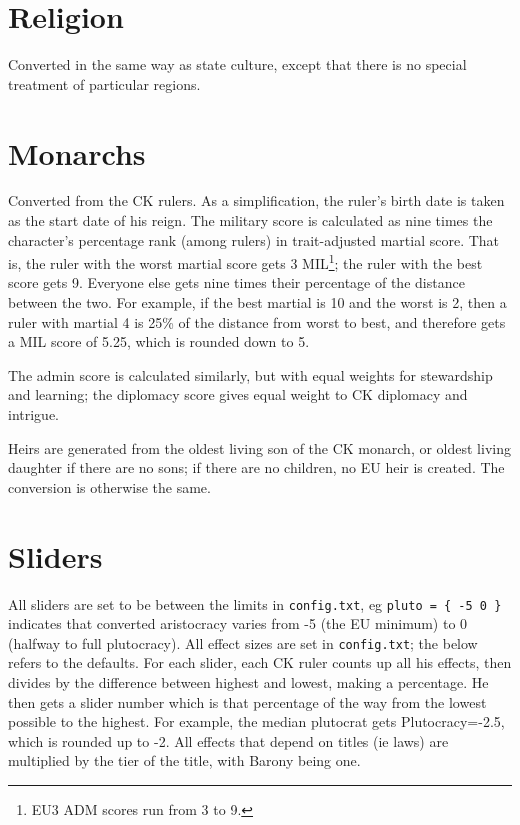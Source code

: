 \documentclass[12pt,ebook,oneside]{book}
\begin{document}
\section{Religion}

Converted in the same way as state culture, except that there is no
special treatment of particular regions. 

\section{Monarchs}

Converted from the CK rulers. As a simplification, the ruler's birth
date is taken as the start date of his reign. The military score is
calculated as nine times the character's percentage rank (among
rulers) in trait-adjusted martial score. That is, the ruler with the
worst martial score gets 3 MIL\footnote{EU3 ADM scores run from 3 to 9.}; the ruler with the best score gets
9. Everyone else gets nine times their percentage of the distance
between the two. For example, if the best martial is 10 and the worst is
2, then a ruler with martial 4 is 25\% of the distance from worst to
best, and therefore gets a MIL score of 5.25, which is rounded down to
5. 

The admin score is calculated similarly, but with equal weights for
stewardship and learning; the diplomacy score gives equal weight to CK
diplomacy and intrigue. 

Heirs are generated from the oldest living son of the CK monarch, or
oldest living daughter if there are no sons; if there are no children,
no EU heir is created. The conversion is otherwise the same. 

\section{Sliders}

All sliders are set to be between the limits in \verb|config.txt|, 
eg \verb|pluto = { -5 0 }| indicates that converted aristocracy varies from -5
(the EU minimum) to 0 (halfway to full plutocracy). All effect sizes
are set in \verb|config.txt|; the below refers to the defaults. For
each slider, each CK ruler counts up all his effects, then divides by
the difference between highest and lowest, making a percentage. He
then gets a slider number which is that percentage of the way from the
lowest possible to the highest. For example, the median plutocrat 
gets Plutocracy=-2.5, which is rounded up to -2. All effects that
depend on titles (ie laws) are multiplied by the tier of the title,
with Barony being one. 
\end{document}
